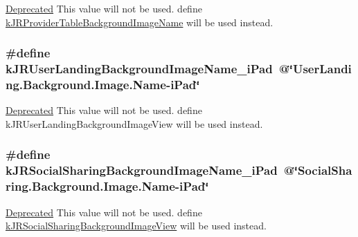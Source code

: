 \label{group__custom_interface_ga25b26cff96d8f174f3bdc040031466b7}
\begin{Desc}
\item[\hyperlink{deprecated__deprecated000009}{Deprecated}]This value will not be used. define \hyperlink{group__custom_interface_ga893fb6e20be0c6658e81a6a5d5c121f0}{kJRProviderTableBackgroundImageName} will be used instead. \end{Desc}
\hypertarget{group__custom_interface_ga52b4fb3801cf3fe6e5a294d9a4d1ff0a}{
\subsubsection[{kJRUserLandingBackgroundImageName\_\-iPad}]{\setlength{\rightskip}{0pt plus 5cm}\#define kJRUserLandingBackgroundImageName\_\-iPad~@\char`\"{}UserLanding.Background.Image.Name-\/iPad\char`\"{}}}
\label{group__custom_interface_ga52b4fb3801cf3fe6e5a294d9a4d1ff0a}
\begin{Desc}
\item[\hyperlink{deprecated__deprecated000010}{Deprecated}]This value will not be used. define kJRUserLandingBackgroundImageView will be used instead. \end{Desc}
\hypertarget{group__custom_interface_ga646cb35f3a7ec2835872ee6df2aceb76}{
\subsubsection[{kJRSocialSharingBackgroundImageName\_\-iPad}]{\setlength{\rightskip}{0pt plus 5cm}\#define kJRSocialSharingBackgroundImageName\_\-iPad~@\char`\"{}SocialSharing.Background.Image.Name-\/iPad\char`\"{}}}
\label{group__custom_interface_ga646cb35f3a7ec2835872ee6df2aceb76}
\begin{Desc}
\item[\hyperlink{deprecated__deprecated000011}{Deprecated}]This value will not be used. define \hyperlink{group__custom_interface_gafe08832d1e15427e1bc1c8c1e3a4c641}{kJRSocialSharingBackgroundImageView} will be used instead. \end{Desc}

